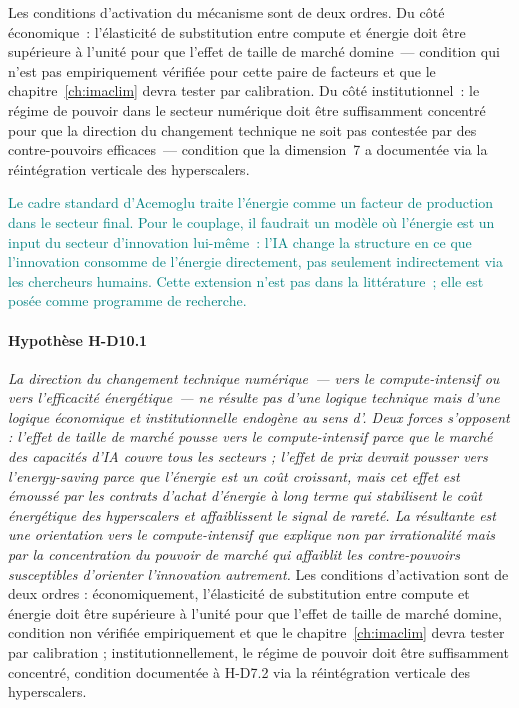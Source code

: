 Les conditions d'activation du mécanisme sont de deux ordres. Du côté économique~: l'élasticité de substitution entre compute et énergie doit être supérieure à l'unité pour que l'effet de taille de marché domine~--- condition qui n'est pas empiriquement vérifiée pour cette paire de facteurs et que le chapitre~\ref{ch:imaclim} devra tester par calibration. Du côté institutionnel~: le régime de pouvoir dans le secteur numérique doit être suffisamment concentré pour que la direction du changement technique ne soit pas contestée par des contre-pouvoirs efficaces~--- condition que la dimension~7 a documentée via la réintégration verticale des hyperscalers.

\textcolor{teal}{Le cadre standard d'Acemoglu traite l'énergie comme un facteur de production dans le secteur final. Pour le couplage, il faudrait un modèle où l'énergie est un input du secteur d'innovation lui-même~: l'IA change la structure en ce que l'innovation consomme de l'énergie directement, pas seulement indirectement via les chercheurs humains. Cette extension n'est pas dans la littérature~; elle est posée comme programme de recherche.}


\paragraph{Hypothèse H-D10.1} \emph{La direction du changement technique numérique~--- vers le \emph{compute}-intensif ou vers l'efficacité énergétique~--- ne résulte pas d'une logique technique mais d'une logique économique et institutionnelle endogène au sens d'\textcite{acemoglu_directed_2002}. Deux forces s'opposent : l'effet de taille de marché pousse vers le compute-intensif parce que le marché des capacités d'IA couvre tous les secteurs ; l'effet de prix devrait pousser vers l'\emph{energy-saving} parce que l'énergie est un coût croissant, mais cet effet est émoussé par les contrats d'achat d'énergie à long terme qui stabilisent le coût énergétique des hyperscalers et affaiblissent le signal de rareté. La résultante est une orientation vers le compute-intensif que \textcite{acemoglu_power_2023} explique non par irrationalité mais par la concentration du pouvoir de marché qui affaiblit les contre-pouvoirs susceptibles d'orienter l'innovation autrement.} Les conditions d'activation sont de deux ordres : économiquement, l'élasticité de substitution entre compute et énergie doit être supérieure à l'unité pour que l'effet de taille de marché domine, condition non vérifiée empiriquement et que le chapitre~\ref{ch:imaclim} devra tester par calibration ; institutionnellement, le régime de pouvoir doit être suffisamment concentré, condition documentée à H-D7.2 via la réintégration verticale des hyperscalers.

